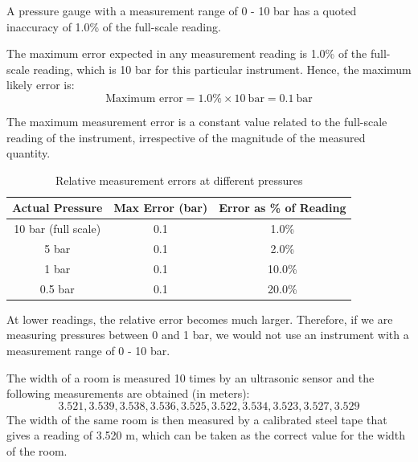 
A pressure gauge with a measurement range of 0 - 10 bar has a quoted inaccuracy of 1.0\% of the full-scale reading.

\begin{solutionblock}
    The maximum error expected in any measurement reading is 1.0\% of the full-scale reading, which is 10 bar for this particular instrument. Hence, the maximum likely error is:
    \[
    \text{Maximum error} = 1.0\% \times 10~\text{bar} = 0.1~\text{bar}
    \]
\end{solutionblock}

\begin{solutionblock}
    The maximum measurement error is a constant value related to the full-scale reading of the instrument, irrespective of the magnitude of the measured quantity.
    \begin{table}[ht]
        \centering
        \begin{tabular}{|c|c|c|}
            \hline
            \textbf{Actual Pressure} & \textbf{Max Error (bar)} & \textbf{Error as \% of Reading} \\
            \hline
            10 bar (full scale) & 0.1 & 1.0\% \\
            5 bar & 0.1 & 2.0\% \\
            1 bar & 0.1 & 10.0\% \\
            0.5 bar & 0.1 & 20.0\% \\
            \hline
        \end{tabular}
        \caption{Relative measurement errors at different pressures}
    \end{table}

    \noindent
    At lower readings, the relative error becomes much larger. Therefore, if we are measuring pressures between 0 and 1 bar, we would not use an instrument with a measurement range of 0 - 10 bar.
\end{solutionblock}


The width of a room is measured 10 times by an ultrasonic sensor and the following measurements are obtained (in meters):
\[
3.521, 3.539, 3.538, 3.536, 3.525, 3.522, 3.534, 3.523, 3.527, 3.529
\]
The width of the same room is then measured by a calibrated steel tape that gives a reading of 3.520 m, 
which can be taken as the correct value for the width of the room.

